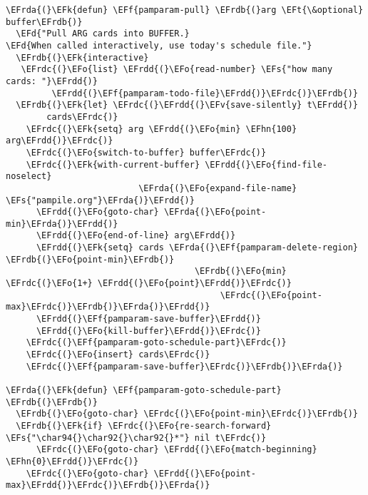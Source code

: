 \documentclass[a4wide,10pt]{article}
\newcommand{\EFs}[1]{\textcolor{EFs}{#1}} %
\newcommand{\EFd}[1]{\textcolor{EFd}{#1}} %
\newcommand{\EFk}[1]{\textcolor{EFk}{#1}} %
\newcommand{\EFf}[1]{\textcolor{EFf}{#1}} %
\newcommand{\EFv}[1]{\textcolor{EFv}{#1}} %
\newcommand{\EFt}[1]{\textcolor{EFt}{#1}} %
\newcommand{\EFo}[1]{\textcolor{EFo}{#1}} %
\newcommand{\EFhn}[1]{\textcolor{EFhn}{\textbf{#1}}} %
\newcommand{\EFrda}[1]{\textcolor{EFrda}{#1}} %
\newcommand{\EFrdb}[1]{\textcolor{EFrdb}{#1}} %
\newcommand{\EFrdc}[1]{\textcolor{EFrdc}{#1}} %
\newcommand{\EFrdd}[1]{\textcolor{EFrdd}{#1}} %
\begin{document}
\begin{Code}
\begin{Verbatim}
\EFrda{(}\EFk{defun} \EFf{pamparam-pull} \EFrdb{(}arg \EFt{\&optional} buffer\EFrdb{)}
  \EFd{"Pull ARG cards into BUFFER.}
\EFd{When called interactively, use today's schedule file."}
  \EFrdb{(}\EFk{interactive}
   \EFrdc{(}\EFo{list} \EFrdd{(}\EFo{read-number} \EFs{"how many cards: "}\EFrdd{)}
         \EFrdd{(}\EFf{pamparam-todo-file}\EFrdd{)}\EFrdc{)}\EFrdb{)}
  \EFrdb{(}\EFk{let} \EFrdc{(}\EFrdd{(}\EFv{save-silently} t\EFrdd{)}
        cards\EFrdc{)}
    \EFrdc{(}\EFk{setq} arg \EFrdd{(}\EFo{min} \EFhn{100} arg\EFrdd{)}\EFrdc{)}
    \EFrdc{(}\EFo{switch-to-buffer} buffer\EFrdc{)}
    \EFrdc{(}\EFk{with-current-buffer} \EFrdd{(}\EFo{find-file-noselect}
                          \EFrda{(}\EFo{expand-file-name} \EFs{"pampile.org"}\EFrda{)}\EFrdd{)}
      \EFrdd{(}\EFo{goto-char} \EFrda{(}\EFo{point-min}\EFrda{)}\EFrdd{)}
      \EFrdd{(}\EFo{end-of-line} arg\EFrdd{)}
      \EFrdd{(}\EFk{setq} cards \EFrda{(}\EFf{pamparam-delete-region} \EFrdb{(}\EFo{point-min}\EFrdb{)}
                                     \EFrdb{(}\EFo{min} \EFrdc{(}\EFo{1+} \EFrdd{(}\EFo{point}\EFrdd{)}\EFrdc{)}
                                          \EFrdc{(}\EFo{point-max}\EFrdc{)}\EFrdb{)}\EFrda{)}\EFrdd{)}
      \EFrdd{(}\EFf{pamparam-save-buffer}\EFrdd{)}
      \EFrdd{(}\EFo{kill-buffer}\EFrdd{)}\EFrdc{)}
    \EFrdc{(}\EFf{pamparam-goto-schedule-part}\EFrdc{)}
    \EFrdc{(}\EFo{insert} cards\EFrdc{)}
    \EFrdc{(}\EFf{pamparam-save-buffer}\EFrdc{)}\EFrdb{)}\EFrda{)}

\EFrda{(}\EFk{defun} \EFf{pamparam-goto-schedule-part} \EFrdb{(}\EFrdb{)}
  \EFrdb{(}\EFo{goto-char} \EFrdc{(}\EFo{point-min}\EFrdc{)}\EFrdb{)}
  \EFrdb{(}\EFk{if} \EFrdc{(}\EFo{re-search-forward} \EFs{"\char94{}\char92{}\char92{}*"} nil t\EFrdc{)}
      \EFrdc{(}\EFo{goto-char} \EFrdd{(}\EFo{match-beginning} \EFhn{0}\EFrdd{)}\EFrdc{)}
    \EFrdc{(}\EFo{goto-char} \EFrdd{(}\EFo{point-max}\EFrdd{)}\EFrdc{)}\EFrdb{)}\EFrda{)}


\end{Verbatim}
\end{Code}
\end{document}
